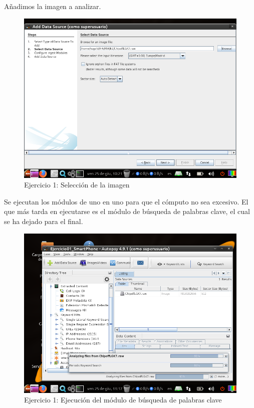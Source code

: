 \documentclass[11pt]{article}
\begin{document}
Añadimos la imagen a analizar.

\begin{figure}[H]
    \caption{Ejercicio 1: Selección de la imagen}
    \centering
    \includegraphics[scale=0.7]{e1-3.png}
\end{figure}

Se ejecutan los módulos de uno en uno para que el cómputo no sea excesivo. El que más tarda en ejecutarse es el módulo de búsqueda de palabras clave, el cual se ha dejado para el final.

\begin{figure}[H]
    \caption{Ejercicio 1: Ejecución del módulo de búsqueda de palabras clave}
    \centering
    \includegraphics[scale=0.7]{e1-4.png}
\end{figure}
\end{document}
